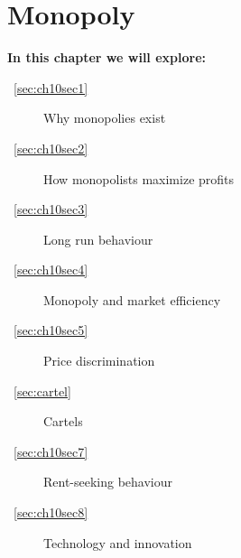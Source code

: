 \chapter{Monopoly} \label{chap:monopoly}

\begin{topics}
\textbf{In this chapter we will explore:}
\begin{description}
\item [~\ref{sec:ch10sec1}] Why monopolies exist
\item [~\ref{sec:ch10sec2}] How monopolists maximize profits
\item [~\ref{sec:ch10sec3}] Long run behaviour
\item [~\ref{sec:ch10sec4}] Monopoly and market efficiency
\item [~\ref{sec:ch10sec5}] Price discrimination
\item [~\ref{sec:cartel}] Cartels
\item [~\ref{sec:ch10sec7}] Rent-seeking behaviour
\item [~\ref{sec:ch10sec8}] Technology and innovation
\end{description}
\end{topics}